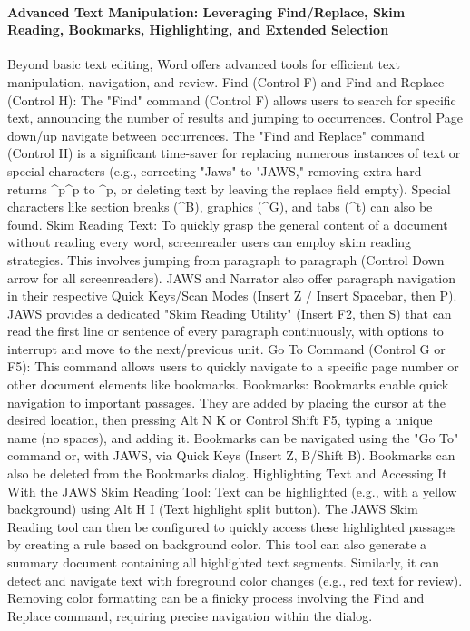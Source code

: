 \paragraph{Advanced Text Manipulation: Leveraging Find/Replace, Skim Reading, Bookmarks, Highlighting, and Extended Selection}
Beyond basic text editing, Word offers advanced tools for efficient text manipulation, navigation, and review.
Find (Control F) and Find and Replace (Control H): The "Find" command (Control F) allows users to search for specific text, announcing the number of results and jumping to occurrences. Control Page down/up navigate between occurrences.\supercite{kingsbury2025} The "Find and Replace" command (Control H) is a significant time-saver for replacing numerous instances of text or special characters (e.g., correcting "Jaws" to "JAWS," removing extra hard returns \textasciicircum{}p\textasciicircum{}p to \textasciicircum{}p, or deleting text by leaving the replace field empty).\supercite{kingsbury2025} Special characters like section breaks (\textasciicircum{}B), graphics (\textasciicircum{}G), and tabs (\textasciicircum{}t) can also be found.\supercite{kingsbury2025}
Skim Reading Text: To quickly grasp the general content of a document without reading every word, screenreader users can employ skim reading strategies. This involves jumping from paragraph to paragraph (Control Down arrow for all screenreaders).\supercite{kingsbury2025} JAWS and Narrator also offer paragraph navigation in their respective Quick Keys/Scan Modes (Insert Z / Insert Spacebar, then P).\supercite{kingsbury2025} JAWS provides a dedicated "Skim Reading Utility" (Insert F2, then S) that can read the first line or sentence of every paragraph continuously, with options to interrupt and move to the next/previous unit.\supercite{kingsbury2025}
Go To Command (Control G or F5): This command allows users to quickly navigate to a specific page number or other document elements like bookmarks.\supercite{kingsbury2025}
Bookmarks: Bookmarks enable quick navigation to important passages. They are added by placing the cursor at the desired location, then pressing Alt N K or Control Shift F5, typing a unique name (no spaces), and adding it.\supercite{kingsbury2025} Bookmarks can be navigated using the "Go To" command or, with JAWS, via Quick Keys (Insert Z, B/Shift B).\supercite{kingsbury2025} Bookmarks can also be deleted from the Bookmarks dialog.\supercite{kingsbury2025}
Highlighting Text and Accessing It With the JAWS Skim Reading Tool: Text can be highlighted (e.g., with a yellow background) using Alt H I (Text highlight split button).\supercite{kingsbury2025} The JAWS Skim Reading tool can then be configured to quickly access these highlighted passages by creating a rule based on background color. This tool can also generate a summary document containing all highlighted text segments.\supercite{kingsbury2025} Similarly, it can detect and navigate text with foreground color changes (e.g., red text for review).\supercite{kingsbury2025} Removing color formatting can be a finicky process involving the Find and Replace command, requiring precise navigation within the dialog.\supercite{kingsbury2025}
